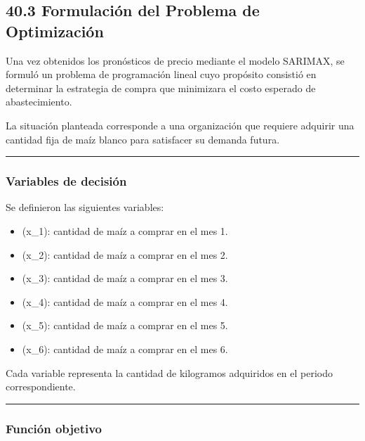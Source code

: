 \documentclass[11pt]{article}
\providecommand{\tightlist}{%
      \setlength{\itemsep}{0pt}\setlength{\parskip}{0pt}}
\begin{document}
    \hypertarget{formulaciuxf3n-del-problema-de-optimizaciuxf3n}{%
\subsection{40.3 Formulación del Problema de
Optimización}\label{formulaciuxf3n-del-problema-de-optimizaciuxf3n}}

Una vez obtenidos los pronósticos de precio mediante el modelo SARIMAX,
se formuló un problema de programación lineal cuyo propósito consistió
en determinar la estrategia de compra que minimizara el costo esperado
de abastecimiento.

La situación planteada corresponde a una organización que requiere
adquirir una cantidad fija de maíz blanco para satisfacer su demanda
futura.

\begin{center}\rule{0.5\linewidth}{0.5pt}\end{center}

\hypertarget{variables-de-decisiuxf3n}{%
\subsubsection{Variables de decisión}\label{variables-de-decisiuxf3n}}

Se definieron las siguientes variables:

\begin{itemize}
\tightlist
\item
  (x\_1): cantidad de maíz a comprar en el mes 1.
\item
  (x\_2): cantidad de maíz a comprar en el mes 2.
\item
  (x\_3): cantidad de maíz a comprar en el mes 3.
\item
  (x\_4): cantidad de maíz a comprar en el mes 4.
\item
  (x\_5): cantidad de maíz a comprar en el mes 5.
\item
  (x\_6): cantidad de maíz a comprar en el mes 6.
\end{itemize}

Cada variable representa la cantidad de kilogramos adquiridos en el
periodo correspondiente.

\begin{center}\rule{0.5\linewidth}{0.5pt}\end{center}

\hypertarget{funciuxf3n-objetivo}{%
\subsubsection{Función objetivo}\label{funciuxf3n-objetivo}}
\end{document}
